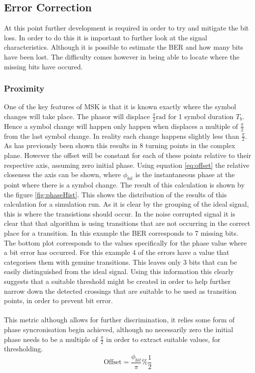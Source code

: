 \pagebreak
\subsection{Error Correction}
At this point further development is required in order to try and mitigate the bit loss. In order to do this it is important to further look at the signal characteristics. Although it is possible to estimate the BER and how many bits have been lost. The difficulty comes however in being able to locate where the missing bits have occured.


\subsubsection{Proximity}
One of the key features of MSK is that it is known exactly where the symbol changes will take place. The phasor will displace $\frac{\pi}{2}\si{\radian}$ for 1 symbol duration $T_b$. Hence a symbol change will happen only happen when displaces a multiple of $\frac{\pi}{2}$ from the last symbol change. In reality each change happens slightly less than $\frac{\pi}{2}$. As has previously been shown this results in 8 turning points in the complex plane. However the offset will be constant for each of these points relative to their respective axis, assuming zero initial phase. Using equation \ref{eq:offset} the relative closeness the axis can be shown, where $\phi_{bit}$ is the instantaneous phase at the point where there is a symbol change. The result of this calculation is shown by the figure \ref{fig:phaseHist}. This shows the distribution of the results of this calculation for a simulation run. As it is clear by the grouping of the ideal signal, this is where the transistions should occur. In the noise corrupted signal it is clear that that algorithm is using transitions that are not occurring in the correct place for a transition. In this example the BER corresponds to 7 missing bits. The bottom plot corresponds to the values specifically for the phase value where a bit error has occurred. For this example 4 of the errors have a value that categorises them with genuine transitions. This leaves only 3 bits that can be easily distinguished from the ideal signal. Using this information this clearly suggests that a suitable threshold might be created in order to help further narrow down the detected crossings that are suitable to be used as transition points, in order to prevent bit error.
\\\\
This metric although allows for further discrimination, it relies some form of phase syncronisation begin achieved, although no necessarily zero the initial phase needs to be a multiple of $\frac{\pi}{2}$ in order to extract suitable values, for thresholding. 
\begin{equation}
    \text{Offset} = \frac{\phi_{bit}}{\pi} \% \frac{1}{2}
    \label{eq:offset}
\end{equation}

